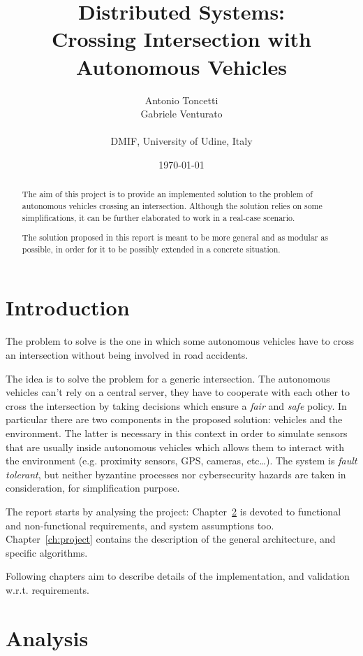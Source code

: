 \documentclass{memoir}
\title{Distributed Systems:\\Crossing Intersection with Autonomous Vehicles}
\author{Antonio Toncetti\\Gabriele Venturato\\\\DMIF, University of Udine, Italy}
\date{%
	\today}
\begin{document}
\maketitle
\begin{abstract}
The aim of this project is to provide an implemented solution to the problem of autonomous vehicles crossing an intersection.
Although the solution relies on some simplifications, it can be further elaborated to work in a real-case scenario.

The solution proposed in this report is meant to be more general and as modular as possible, in order for it to be possibly extended in a concrete situation.
\end{abstract}

\chapter{Introduction}\label{ch:intro}

The problem to solve is the one in which some autonomous vehicles have to cross an intersection without being involved in road accidents. 

The idea is to solve the problem for a generic intersection. The autonomous vehicles can't rely on a central server, they have to cooperate with each other to cross the intersection by taking decisions which ensure a \emph{fair} and \emph{safe} policy. In particular there are two components in the proposed solution: vehicles and the environment. The latter is necessary in this context in order to simulate sensors that are usually inside autonomous vehicles which allows them to interact with the environment (e.g. proximity sensors, GPS, cameras, etc\dots).
The system is \emph{fault tolerant}, but neither byzantine processes nor cybersecurity hazards are taken in consideration, for simplification purpose.

The report starts by analysing the project: Chapter~\ref{ch:analysis} is devoted to functional and non-functional requirements, and system assumptions too. Chapter~\ref{ch:project} contains the description of the general architecture, and specific algorithms.

Following chapters aim to describe details of the implementation, and validation w.r.t. requirements.



\chapter{Analysis}\label{ch:analysis}
\end{document}
